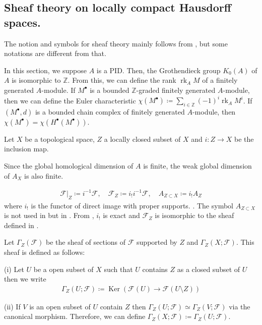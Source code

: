 \documentclass[a4paper,dvipdfmx,reqno,12pt]{amsart}
\theoremstyle{definition}
\newcommand{\deq}{\coloneqq}
\newcommand{\Z}{\mathbb{Z}}%
\newcommand{\mcal}[1]{\mathcal{#1}}%
\newcommand{\opn}[1]{\operatorname{#1}}
\numberwithin{equation}{section}
\begin{document}
\subsection{Sheaf theory on locally compact 
Hausdorff spaces.}
\cite{iversenCohomologySheaves1986a,MR1299726,MR1269324,MR2050072}

The notion and symbols for 
sheaf theory mainly follows from \cite{MR1299726}, 
but some notations are different from that.

In this section, we suppose $A$ is a PID. Then, the Grothendieck 
group $K_0(A)$ of $A$ is isomorphic to $\Z$. From this, 
we can define the rank $\opn{rk}_A M$ of 
a finitely generated $A$-module.
If $M^{\bullet}$ is a bounded $\Z$-graded finitely generated $A$-module,
then we can define the Euler characteristic 
$\chi(M^{\bullet})\deq \sum_{i\in \Z}(-1)^{i}\opn{rk}_A M^{i}$.
If $(M^{\bullet},d)$ is a bounded chain complex of finitely 
generated $A$-module, then 
$\chi(M^{\bullet})=\chi(H^{\bullet}(M^{\bullet}))$.


Let $X$ be a topological space, $Z$ a locally closed 
subset of $X$
and $i\colon Z\to X$ be the inclusion map.

Since the global homological 
dimension of $A$ \cite[Exercise I.28]{MR1299726} is finite,
the weak global dimension of $A_X$ \cite[Definition 2.6.2]{MR1299726} is also finite.

\begin{align}
\mcal{F}|_{Z}\deq i^{-1}\mcal{F}, \quad 
\mcal{F}_Z\deq i_! i^{-1}\mcal{F}, \quad 
A_{Z\subset X}\deq i_! A_Z
\end{align}
where $i_!$ is the functor of 
direct image with proper supports. \cite[(2.5.1)]{MR1299726}.
The symbol $A_{Z\subset X}$ is not used in \cite{MR1299726} 
but in \cite{MR932640}.
From \cite[Proposition 2.5.4]{MR1299726}, $i_!$ is exact 
and $\mcal{F}_Z$ is isomorphic to the sheaf defined in
\cite[p.93]{MR1299726}.

Let $\Gamma_{Z}(\mcal{F})$ be the sheaf of sections of 
$\mcal{F}$ supported by $Z$
\cite[Definition 2.3.8]{MR1299726} and 
$\Gamma_{Z}(X;\mcal{F})$. This sheaf is defined as follows:

(i) Let $U$ be a open subset of $X$ such that $U$ contains
$Z$ as a closed subset of $U$ then we write
\begin{align}
  \Gamma_Z(U;\mcal{F})\deq \opn{Ker}(\mcal{F}(U) \to 
\mcal{F}(U\setminus Z))
\end{align}

(ii) If $V$ is an open subset of $U$ contain $Z$ then
$\Gamma_{Z}(U;\mcal{F})\simeq \Gamma_{Z}(V;\mcal{F})$
via the canonical morphism. Therefore, we can define
$\Gamma_{Z}(X;\mcal{F})\deq \Gamma_{Z}(U;\mcal{F})$.
\end{document}
